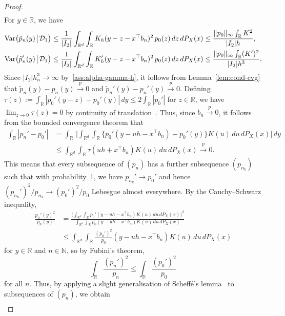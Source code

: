 \documentclass[a4paper]{article}
\newcommand{\N}{\mathbb{N}}
\newcommand{\R}{\mathbb{R}}
\newcommand{\norm}[1]{\|{#1}\|}
\newcommand{\cvp}{\overset{p}{\to}}
\DeclareMathOperator\Var{Var}
\theoremstyle{definition}
\begin{document}
\begin{proof}
\begin{align*}
\end{align*}
For $y \in \R$, we have
\begin{align}
\label{eq:var-pnh}
\Var\bigl(\tilde{p}_n(y) \!\bigm|\! \mathcal{D}_1\bigr) &\leq \frac{1}{|I_2|}\int_{\R^d} \int_\R K_h(y - z - x^\top b_n)^2\,p_0(z)\,dz\,dP_X(x) \leq \frac{\norm{p_0}_\infty \int_\R K^2}{|I_2| h},\\
\label{eq:var-pnh'}
\Var\bigl(\tilde{p}_n'(y) \!\bigm|\! \mathcal{D}_1\bigr) &\leq \frac{1}{|I_2|}\int_{\R^d} \int_\R K_h'(y - z - x^\top b_n)^2\,p_0(z)\,dz\,dP_X(x) \leq \frac{\norm{p_0}_\infty \int_\R (K')^2}{|I_2| h^3}.
\end{align}
Since $|I_2| h_n^3 \to \infty$ by~\ref{ass:alpha-gamma-h}, it follows from Lemma~\ref{lem:cond-cvg} that $\tilde{p}_n(y) - p_n(y) \cvp 0$ and $\tilde{p}_n'(y) - p_n'(y) \cvp 0$. Defining $\tau(z) := \int_\R |p_0'(y - z) - p_0'(y)|\,dy \leq 2\int_\R |p_0'|$ for $z \in \R$, we have $\lim_{z \to 0}\tau(z) = 0$ by continuity of translation~\citep[Proposition~8.5]{folland1999real}. Thus, since $b_n \cvp 0$, it follows from the bounded convergence theorem that
\begin{align*}
\int_\R |p_n' - p_0'| &= \int_\R\,\biggl|\int_{\R^d} \int_\R \bigl\{p_0'(y - uh - x^\top b_n) - p_0'(y)\bigr\}K(u)\,du\,dP_X(x)\biggr|\,dy \\
&\leq \int_{\R^d}\int_\R \tau(uh + x^\top b_n)K(u)\,du\,dP_X(x) \cvp 0.
\end{align*}
This means that every subsequence of $(p_n)$ has a further subsequence $(p_{n_k})$ such that with probability~1, we have $p_{n_k}' \to p_0'$ and hence $(p_{n_k}')^2/p_{n_k} \to (p_0')^2/p_0$ Lebesgue almost everywhere. By the Cauchy--Schwarz inequality,
\begin{align*}
\frac{p_n'(y)^2}{p_n(y)} &= \frac{\bigl(\int_{\R^d} \int_\R p_0'(y - uh - x^\top b_n)K(u)\,du\,dP_X(x)\bigr)^2}{\int_{\R^d} \int_\R p_0(y - uh - x^\top b_n)K(u)\,du\,dP_X(x)} \\
&\leq \int_{\R^d} \int_\R \frac{(p_0')^2}{p_0}(y - uh - x^\top b_n)K(u)\,du\,dP_X(x)
\end{align*}
for $y \in \R$ and $n \in \N$, so by Fubini's theorem,
\begin{equation}
\int_\R \frac{(p_n')^2}{p_n} \leq \int_\R \frac{(p_0')^2}{p_0}
\end{equation}
for all $n$. Thus, by applying a slight generalisation of Scheff\'e's lemma~\citep[Lemma~2.29]{vdV1998asymptotic} to subsequences of $(p_n)$, we obtain
\begin{align}
\label{eq:pnh-inequality}

\end{align}
\end{proof}
\end{document}
